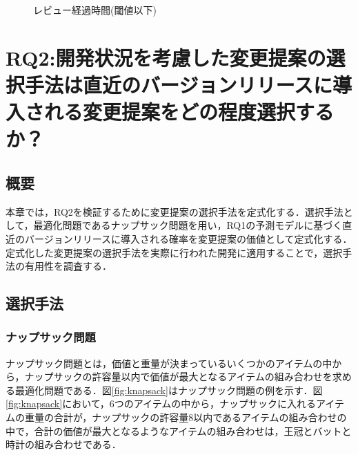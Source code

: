 \documentclass[submit,ses,noauthor]{ipsj}
\begin{document}
\begin{figure}[h]
  \centering
  \caption{レビュー経過時間(閾値以下)}
  \label{fig:first_review_age_limitbox}
\end{figure}


\section{RQ2:開発状況を考慮した変更提案の選択手法は直近のバージョンリリースに導入される変更提案をどの程度選択するか？}\label{chap:rq-2}

\subsection{概要}
本章では，RQ2を検証するために変更提案の選択手法を定式化する．選択手法として，最適化問題であるナップサック問題を用い，RQ1の予測モデルに基づく直近のバージョンリリースに導入される確率を変更提案の価値として定式化する．定式化した変更提案の選択手法を実際に行われた開発に適用することで，選択手法の有用性を調査する．

\subsection{選択手法}

\subsubsection{ナップサック問題}
ナップサック問題とは，価値と重量が決まっているいくつかのアイテムの中から，ナップサックの許容量以内で価値が最大となるアイテムの組み合わせを求める最適化問題である．図\ref{fig:knapsack}はナップサック問題の例を示す．図\ref{fig:knapsack}において，6つのアイテムの中から，ナップサックに入れるアイテムの重量の合計が，ナップサックの許容量8以内であるアイテムの組み合わせの中で，合計の価値が最大となるようなアイテムの組み合わせは，王冠とバットと時計の組み合わせである．
\end{document}

